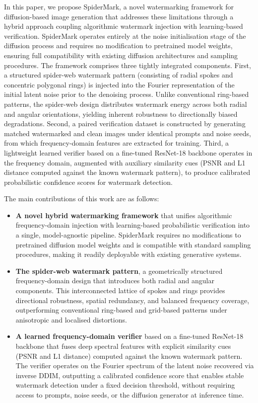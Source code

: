 \documentclass[lettersize,journal,review]{IEEEtran}
\begin{document}
 In this paper, we propose SpiderMark, a novel watermarking framework for diffusion-based image generation that addresses these limitations through a hybrid approach coupling algorithmic watermark injection with learning-based verification. SpiderMark operates entirely at the noise initialisation stage of the diffusion process and requires no modification to pretrained model weights, ensuring full compatibility with existing diffusion architectures and sampling procedures. The framework comprises three tightly integrated components. First, a structured spider-web watermark pattern (consisting of radial spokes and concentric polygonal rings) is injected into the Fourier representation of the initial latent noise prior to the denoising process. Unlike conventional ring-based patterns, the spider-web design distributes watermark energy across both radial and angular orientations, yielding inherent robustness to directionally biased degradations. Second, a paired verification dataset is constructed by generating matched watermarked and clean images under identical prompts and noise seeds, from which frequency-domain features are extracted for training. Third, a lightweight learned verifier based on a fine-tuned ResNet-18 backbone operates in the frequency domain, augmented with auxiliary similarity cues (PSNR and L1 distance computed against the known watermark pattern), to produce calibrated probabilistic confidence scores for watermark detection.

 The main contributions of this work are as follows:

\begin{itemize}
    \item \textbf{A novel hybrid watermarking framework} that unifies algorithmic frequency-domain injection with learning-based probabilistic verification into a single, model-agnostic pipeline. SpiderMark requires no modifications to pretrained diffusion model weights and is compatible with standard sampling procedures, making it readily deployable with existing generative systems.

    \item \textbf{The spider-web watermark pattern}, a geometrically structured frequency-domain design that introduces both radial and angular components. This interconnected lattice of spokes and rings provides directional robustness, spatial redundancy, and balanced frequency coverage, outperforming conventional ring-based and grid-based patterns under anisotropic and localised distortions.

    \item \textbf{A learned frequency-domain verifier} based on a fine-tuned ResNet-18 backbone that fuses deep spectral features with explicit similarity cues (PSNR and L1 distance) computed against the known watermark pattern. The verifier operates on the Fourier spectrum of the latent noise recovered via inverse DDIM, outputting a calibrated confidence score that enables stable watermark detection under a fixed decision threshold, without requiring access to prompts, noise seeds, or the diffusion generator at inference time.
\end{itemize}
\end{document}
